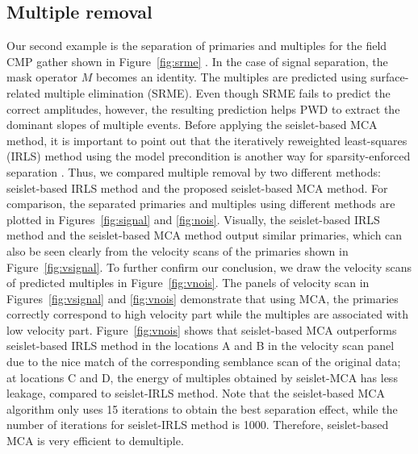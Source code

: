 
% 
  

\subsection{Multiple removal}

Our second example is the separation of primaries and multiples for the field CMP gather shown in Figure~\ref{fig:srme} \citep{fomel2006regularizing}. In the case of signal separation, the mask operator $M$ becomes an identity.
The multiples are predicted using surface-related multiple elimination (SRME). Even though SRME fails to predict the correct amplitudes, however, the resulting prediction helps PWD to extract the dominant slopes of multiple events. 
Before applying the seislet-based MCA method, it is important to point out that the iteratively reweighted least-squares (IRLS) method using the model precondition is another way for sparsity-enforced separation \citep{daubechies2010}. Thus, we compared multiple removal by two different methods: seislet-based IRLS method and the proposed seislet-based MCA method. For comparison, the separated primaries and multiples using different methods are plotted in Figures~\ref{fig:signal} and  \ref{fig:nois}. Visually, the seislet-based IRLS method and the seislet-based MCA method output similar primaries, which can also be seen clearly from the velocity scans of the primaries shown in Figure~\ref{fig:vsignal}. To further confirm our conclusion, we draw the velocity scans of predicted multiples in Figure~\ref{fig:vnois}. The panels of velocity scan in Figures~\ref{fig:vsignal} and \ref{fig:vnois} demonstrate that using MCA, the primaries correctly correspond to high velocity part while the multiples are associated with low velocity part. Figure~\ref{fig:vnois} shows that seislet-based MCA outperforms seislet-based IRLS method in the locations A and B in the velocity scan panel due to the nice match of the corresponding semblance scan of the original data; at locations C and D, the energy of multiples obtained by seislet-MCA has less leakage, compared to seislet-IRLS method. Note that the seislet-based MCA algorithm only uses 15 iterations to obtain the best separation effect, while the number of iterations for seislet-IRLS method is 1000. Therefore, seislet-based MCA is very efficient to demultiple.


